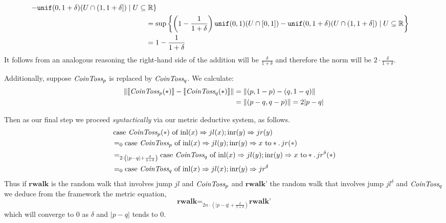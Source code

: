 \begin{example}
\begin{align*}
        - \mathtt{unif}(0,1 + \delta)(U \cap (1,1 + \delta]) 
        \mid U \subseteq \Reals \}
        \\
        &
        \hspace{-15pt}= \sup \left \{ \left (1 - \frac{1}{1+\delta} \right ) 
                \mathtt{unif}(0,1)(U \cap [0,1]) 
        - \mathtt{unif}(0,1 + \delta)(U \cap (1,1 + \delta]) 
        \mid U \subseteq \Reals \right \}
        \\
        & \hspace{-15pt} = 1 - \frac{1}{1+\delta} 
        \end{align*}
        It follows from an analogous reasoning the right-hand side of the
        addition will be $\frac{\delta}{1 + \delta}$ and therefore the norm
        will be $2 \cdot {\frac{\delta}{1 + \delta}}$.

Additionally, suppose  $\emph{CoinToss}_p$ is replaced by $\emph{CoinToss}_q$. We calculate:
\begin{align*}
    \left\lVert \left \llbracket \emph{CoinToss}_p(*) \right \rrbracket - \left \llbracket \emph{CoinToss}_q(*) \right \rrbracket \right\rVert & = \left\lVert (p,1-p) - (q, 1-q) \right\rVert \\
    & =\left\lVert (p-q,q-p) \right\rVert  = 2|p-q|
  \end{align*}


Then as our final step we proceed
        \emph{syntactically} via our metric deductive system, as follows.
        \begin{align*}
               &\, \text{case } \emph{CoinToss}_p (*) \text{ of } \mathrm{inl}(x) \Rightarrow jl(x) ; 
               \mathrm{inr}(y) \Rightarrow jr(y)
               \\
               & =_0
               \text{case } \emph{CoinToss}_p \text{ of } \mathrm{inl}(x) \Rightarrow
               jl(y)
               ; 
               \mathrm{inr}(y) \Rightarrow  x \text{ to} 
               \ast. \, jr(\ast) 
               \\
               & =_{2 \cdot \left(|p-q|+ \frac{\delta}{1 + \delta}\right)}
               \text{case } \emph{CoinToss}_q \text{ of } \mathrm{inl}(x) \Rightarrow 
               jl(y); 
               \mathrm{inr}(y) \Rightarrow  x \text{ to} 
               \ast. \, jr^{\delta}(\ast) 
               \\
               & =_0
               \text{case } \emph{CoinToss}_q \text{ of } \mathrm{inl}(x) \Rightarrow jl(x) 
               ; 
               \mathrm{inr}(y) \Rightarrow jr^{\delta}
        \end{align*}
        Thus if $\textbf{rwalk}$ is the random walk that
        involves jump $jl$ and $ \emph{CoinToss}_p$  and $\textbf{rwalk'}$ the random
        walk that involves jump $jl^\delta$ and $ \emph{CoinToss}_q$ we deduce from the framework the metric
        equation,
        \[
                \textbf{rwalk} =_{2n \cdot \left(|p-q|+ \frac{\delta}{1 + \delta}\right)}
                \textbf{rwalk'} 
        \]
        which will converge to $0$ as $\delta$ and $|p-q|$ tends to $0$.


\end{example}
